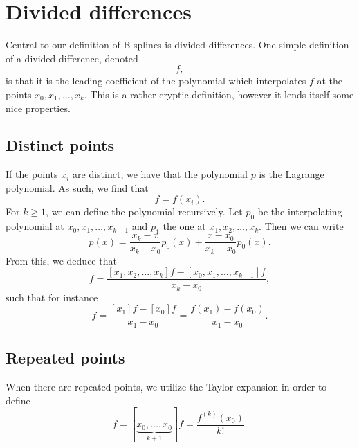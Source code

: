 \section{Divided differences}
Central to our definition of B-splines is divided differences.
One simple definition of a divided difference, denoted
\begin{equation}
    [x_0, x_1, \dots, x_k]f,
\end{equation}
is that it is the leading coefficient of the polynomial which interpolates $f$ at the points $x_0, x_1, \dots, x_k$.
This is a rather cryptic definition, however it lends itself some nice properties.

\subsection{Distinct points}
If the points $x_i$ are distinct, we have that the polynomial $p$ is the Lagrange polynomial.
As such, we find that
\begin{equation}
    [x_i]f = f(x_i).
\end{equation}
For $k \geq 1$, we can define the polynomial recursively.
Let $p_0$ be the interpolating polynomial at $x_0, x_1, \dots, x_{k - 1}$ and $p_1$ the one at $x_1, x_2, \dots, x_k$.
Then we can write
\begin{equation}
    p(x) = \frac{x_k - x}{x_k - x_0} p_0(x) + \frac{x - x_0}{x_k - x_0} p_0(x).
\end{equation}
From this, we deduce that
\begin{equation}
    [x_0, x_1, \dots, x_k]f = \frac{
        [x_1, x_2, \dots, x_k]f
        - [x_0, x_1, \dots, x_{k - 1}]f
    }{x_k - x_0},
\end{equation}
such that for instance
\begin{equation}
    [x_0, x_1]f
    = \frac{[x_1]f - [x_0]f}{x_1 - x_0}
    = \frac{f(x_1) - f(x_0)}{x_1 - x_0}.
\end{equation}

\subsection{Repeated points}
When there are repeated points, we utilize the Taylor expansion in order to define
\begin{equation}
    [x_0, \dots, x_k]f = [\underbrace{x_0, \dots, x_0}_{k+1}]f = \frac{f^{(k)}(x_0)}{k!}.
\end{equation}